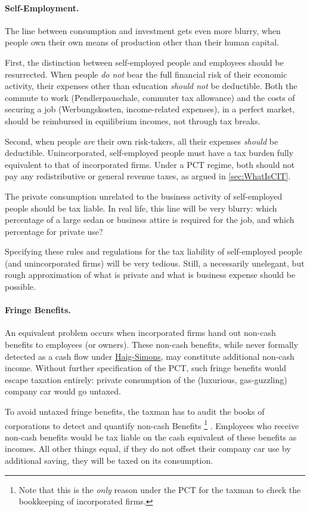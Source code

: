 \paragraph{Self-Employment.}
The line between consumption and investment gets even more blurry, when people own their own means of production other than their human capital.

First, the distinction between self-employed people and employees should be resurrected.
When people \emph{do not} bear the full financial risk of their economic activity, their expenses other than education \emph{should not} be deductible.
Both the commute to work (Pendlerpauschale, commuter tax allowance) and the costs of securing a job (Werbungskosten, income-related expenses), in a perfect market, should be reimbursed in equilibrium incomes, not through tax breaks.

Second, when people \emph{are} their own risk-takers, all their expenses \emph{should} be deductible.
Unincorporated, self-employed people must have a tax burden fully equivalent to that of incorporated firms.
Under a PCT regime, both should not pay any redistributive or general revenue taxes, as argued in \autoref{sec:WhatIsCIT}.

The private consumption unrelated to the business activity of self-employed people should be tax liable.
In real life, this line will be very blurry:
which percentage of a large sedan or business attire is required for the job, and which percentage for private use?

Specifying these rules and regulations for the tax liability of self-employed people (and unincorporated firms) will be very tedious.
Still, a necessarily unelegant, but rough approximation of what is private and what is business expense should be possible.

\paragraph{Fringe Benefits.}
An equivalent problem occurs when incorporated firms hand out non-cash benefits to employees (or owners).
These non-cash benefits, while never formally detected as a cash flow under \hyperref[eq:HaigSimonsPCT]{Haig-Simons}, may constitute additional non-cash income.
Without further specification of the PCT, such fringe benefits would escape taxation entirely:
private consumption of the (luxurious, gas-guzzling) company car would go untaxed.

To avoid untaxed fringe benefits, the taxman has to audit the books of corporations to detect and quantify non-cash Benefits
\footnote{
	Note that this is the \emph{only} reason under the PCT for the taxman to check the bookkeeping of incorporated firms.
}
.
Employees who receive non-cash benefits would be tax liable on the cash equivalent of these benefits as incomes.
All other things equal, if they do not offset their company car use by additional saving, they will be taxed on its consumption.


